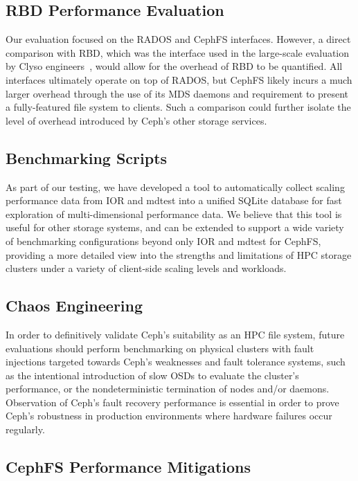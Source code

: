 \subsection{\acs{RBD} Performance Evaluation}

Our evaluation focused on the \ac{RADOS} and \ac{CephFS} interfaces. However, a direct comparison with \ac{RBD}, which was the interface used in the large-scale evaluation by Clyso engineers~\cite{ceph-1tib}, would allow for the overhead of \ac{RBD} to be quantified. All interfaces ultimately operate on top of \ac{RADOS}, but \ac{CephFS} likely incurs a much larger overhead through the use of its \ac{MDS} daemons and requirement to present a fully-featured file system to clients. Such a comparison could further isolate the level of overhead introduced by Ceph's other storage services.

\subsection{Benchmarking Scripts}

As part of our testing, we have developed a tool to automatically collect scaling performance data from \ac{IOR} and mdtest into a unified SQLite database for fast exploration of multi-dimensional performance data. We believe that this tool is useful for other storage systems, and can be extended to support a wide variety of benchmarking configurations beyond only \ac{IOR} and mdtest for \ac{CephFS}, providing a more detailed view into the strengths and limitations of \ac{HPC} storage clusters under a variety of client-side scaling levels and workloads.

\subsection{Chaos Engineering}

In order to definitively validate Ceph's suitability as an \ac{HPC} file system, future evaluations should perform benchmarking on physical clusters with fault injections targeted towards Ceph's weaknesses and fault tolerance systems, such as the intentional introduction of slow \acp{OSD} to evaluate the cluster's performance, or the nondeterministic termination of nodes and/or daemons. Observation of Ceph's fault recovery performance is essential in order to prove Ceph's robustness in production environments where hardware failures occur regularly.

\subsection{\acs{CephFS} Performance Mitigations}

